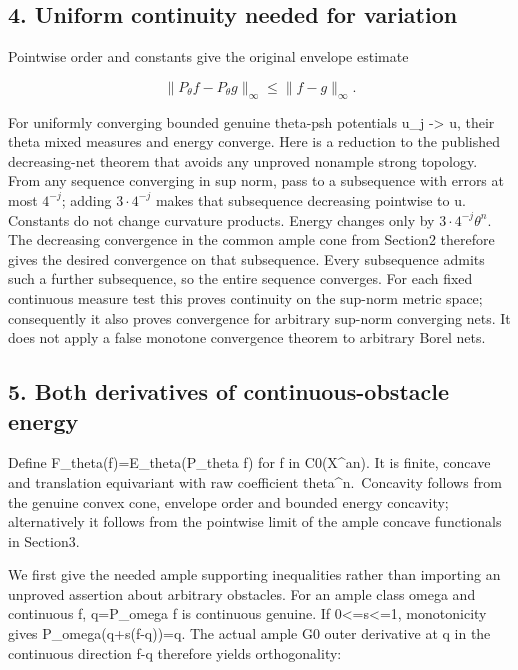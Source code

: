 \documentclass[
]{article}
\begin{document}
\subsection{4. Uniform continuity needed for
variation}\label{uniform-continuity-needed-for-variation}

Pointwise order and constants give the original envelope estimate

\[\|P_\theta f-P_\theta g\|_\infty\leq\|f-g\|_\infty.\]

For uniformly converging bounded genuine theta-psh potentials u\_j
-\textgreater{} u, their theta mixed measures and energy converge. Here
is a reduction to the published decreasing-net theorem that avoids any
unproved nonample strong topology. From any sequence converging in sup
norm, pass to a subsequence with errors at most \(4^{-j}\); adding
\(3\cdot4^{-j}\) makes that subsequence decreasing pointwise to u.
Constants do not change curvature products. Energy changes only by
\(3\cdot4^{-j}\theta^n\). The decreasing convergence in the common ample
cone from Section2 therefore gives the desired convergence on that
subsequence. Every subsequence admits such a further subsequence, so the
entire sequence converges. For each fixed continuous measure test this
proves continuity on the sup-norm metric space; consequently it also
proves convergence for arbitrary sup-norm converging nets. It does not
apply a false monotone convergence theorem to arbitrary Borel nets.

\subsection{5. Both derivatives of continuous-obstacle
energy}\label{both-derivatives-of-continuous-obstacle-energy}

Define F\_theta(f)=E\_theta(P\_theta f) for f in C0(X\^{}an). It is
finite, concave and translation equivariant with raw coefficient
theta\^{}n.~Concavity follows from the genuine convex cone, envelope
order and bounded energy concavity; alternatively it follows from the
pointwise limit of the ample concave functionals in Section3.

We first give the needed ample supporting inequalities rather than
importing an unproved assertion about arbitrary obstacles. For an ample
class omega and continuous f, q=P\_omega f is continuous genuine. If
0\textless=s\textless=1, monotonicity gives P\_omega(q+s(f-q))=q. The
actual ample G0 outer derivative at q in the continuous direction f-q
therefore yields orthogonality:
\end{document}
